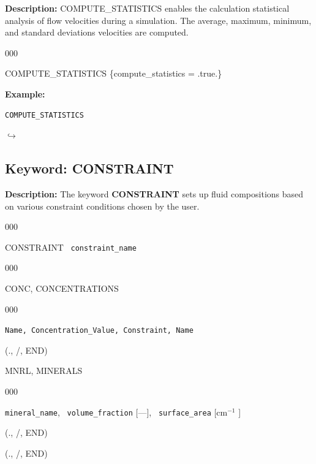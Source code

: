 \documentclass[12pt]{article}
\newcommand\return{{\hfill$\hookrightarrow$}}
\begin{document}
\noindent
{\bf Description:}
COMPUTE\_STATISTICS enables the calculation statistical analysis of flow velocities during a simulation.  The average, maximum, minimum, and standard deviations velocities are computed.

\begin{deflist}{000}
\item [COMPUTE\_STATISTICS] \{compute\_statistics = .true.\}
\end{deflist}


\noindent
{\bf Example:}
\begin{verbatim}
COMPUTE_STATISTICS
\end{verbatim}

\hyperlink{target_key}{\return}


\newpage
\protect\hypertarget{target_constraint}{}

\subsection{Keyword: CONSTRAINT}

\noindent
{\bf Description:}
The keyword {\bf CONSTRAINT} sets up fluid compositions based on various constraint conditions chosen by the user.

\begin{deflist}{000}
\item [CONSTRAINT] \ {\tt constraint\_name}
\begin{deflist}{000}
\item[CONC, CONCENTRATIONS] ~
\begin{deflist}{000}
\item[{\tt Name, Concentration\_Value, Constraint, Name}] ~
\end{deflist}
\item[(., /, END)] ~


\item[MNRL, MINERALS] ~

\begin{deflist}{000}
\item[{\tt mineral\_name}, \ {\tt volume\_fraction} {[---]}, \ {\tt surface\_area} [cm$^{-1}$]]
\end{deflist}
\item[(., /, END)]
\end{deflist}
\item[(., /, END)]
\end{deflist}
\end{document}
